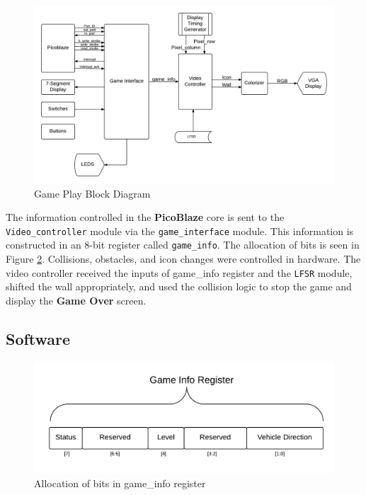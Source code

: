 \documentclass[11pt]{article}
\begin{document}
	\begin{figure}[h]\centering
	\includegraphics[height=0.7\textwidth, width=0.7\textheight]{Images/gameplay_diagram.png}
	\caption{Game Play Block Diagram}
		\label{block_diagram}
	\end{figure}	
		
The information controlled in the \textbf{PicoBlaze} core is sent to the \texttt{Video\_controller} module via the \texttt{game\_interface} module.  This information is constructed in an 8-bit register called \texttt{game\_info}.  The allocation of bits is seen in Figure \ref{game_info_bits}.  Collisions, obstacles, and icon changes were controlled in hardware.  The video controller received the inputs of game\_info register and the \texttt{LFSR} module, shifted the wall appropriately, and used the collision logic to stop the game and display the \textbf{Game Over} screen.

\subsection{Software}

					
		\begin{figure}[h]\centering
		  \includegraphics[width=.7\textwidth]{Images/game_info_bits.png}
		  \caption{Allocation of bits in game\_info register}
		  \label{game_info_bits}
		\end{figure}	
\end{document}
